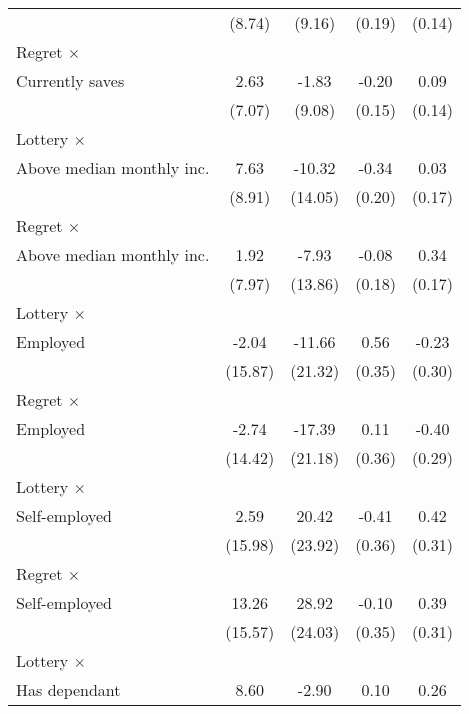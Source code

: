 \begin{table}[htbp]
\begin{tabular}{l*{4}{c}}
                &   (8.74)         &   (9.16)         &   (0.19)         &   (0.14)         \\
\addlinespace
Regret $\times$ \\ Currently saves&     2.63         &    -1.83         &    -0.20         &     0.09         \\
                &   (7.07)         &   (9.08)         &   (0.15)         &   (0.14)         \\
\addlinespace
Lottery $\times$ \\ Above median monthly inc.&     7.63         &   -10.32         &    -0.34\sym{*}  &     0.03         \\
                &   (8.91)         &  (14.05)         &   (0.20)         &   (0.17)         \\
\addlinespace
Regret $\times$ \\ Above median monthly inc.&     1.92         &    -7.93         &    -0.08         &     0.34\sym{**} \\
                &   (7.97)         &  (13.86)         &   (0.18)         &   (0.17)         \\
\addlinespace
Lottery $\times$ \\ Employed&    -2.04         &   -11.66         &     0.56         &    -0.23         \\
                &  (15.87)         &  (21.32)         &   (0.35)         &   (0.30)         \\
\addlinespace
Regret $\times$ \\ Employed&    -2.74         &   -17.39         &     0.11         &    -0.40         \\
                &  (14.42)         &  (21.18)         &   (0.36)         &   (0.29)         \\
\addlinespace
Lottery $\times$ \\ Self-employed&     2.59         &    20.42         &    -0.41         &     0.42         \\
                &  (15.98)         &  (23.92)         &   (0.36)         &   (0.31)         \\
\addlinespace
Regret $\times$ \\ Self-employed&    13.26         &    28.92         &    -0.10         &     0.39         \\
                &  (15.57)         &  (24.03)         &   (0.35)         &   (0.31)         \\
\addlinespace
Lottery $\times$ \\ Has dependant&     8.60         &    -2.90         &     0.10         &     0.26         \\

\end{tabular}
\end{table}
